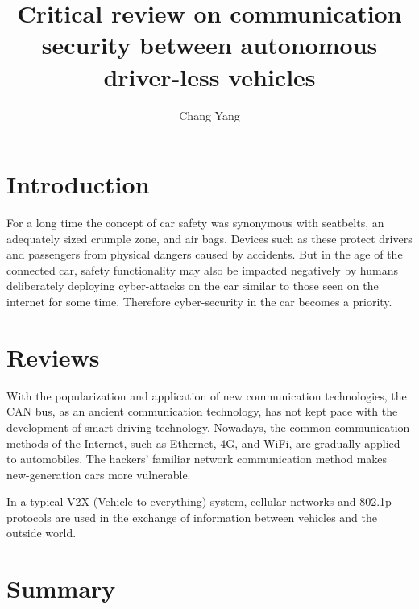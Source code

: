 \documentclass[]{article}
\title{Critical review on communication security between autonomous driver-less vehicles}
\author{Chang Yang}
\begin{document}
\maketitle

\section{Introduction}
For a long time the concept of car safety was synonymous with seatbelts, an adequately sized crumple zone, and air bags. Devices such as these protect drivers and passengers from physical dangers caused by accidents. But in the age of the connected car, safety functionality may also be impacted negatively by humans deliberately deploying cyber-attacks on the car similar to those seen on the internet for some time. Therefore cyber-security in the car becomes a priority.

\section{Reviews}
With the popularization and application of new communication technologies, the CAN bus, as an ancient communication technology, has not kept pace with the development of smart driving technology. Nowadays, the common communication methods of the Internet, such as Ethernet, 4G, and WiFi, are gradually applied to automobiles. The hackers' familiar network communication method makes new-generation cars more vulnerable.

In a typical V2X (Vehicle-to-everything) system, cellular networks and 802.1p protocols are used in the exchange of information between vehicles and the outside world.

\section{Summary}



\end{document}
